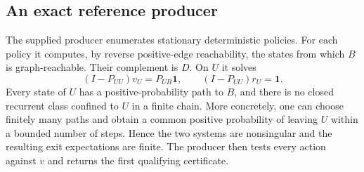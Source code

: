 \documentclass[11pt,letterpaper]{article}
\theoremstyle{definition}\newtheorem{definition}[theorem]{Definition}
\theoremstyle{remark}\newtheorem{remark}[theorem]{Remark}
\begin{document}
\subsection{An exact reference producer}
The supplied producer enumerates stationary deterministic policies. For each policy it computes, by reverse positive-edge reachability, the states from which $B$ is graph-reachable. Their complement is $D$. On $U$ it solves
\[
 (I-P_{UU})v_U=P_{UB}\boldsymbol1,
 \qquad (I-P_{UU})r_U=\boldsymbol1.
\]
Every state of $U$ has a positive-probability path to $B$, and there is no closed recurrent class confined to $U$ in a finite chain. More concretely, one can choose finitely many paths and obtain a common positive probability of leaving $U$ within a bounded number of steps. Hence the two systems are nonsingular and the resulting exit expectations are finite. The producer then tests every action against $v$ and returns the first qualifying certificate.
\end{document}
